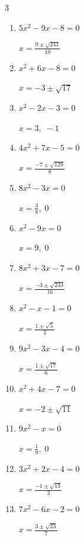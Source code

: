 \begin{multicols}{3}
\begin{enumerate}
  \item $5x^{2}-9x-8=0$

        $\displaystyle x=\frac{9\pm \sqrt{241}}{10}$

  \item $x^{2}+6x-8=0$

        $\displaystyle x=-3\pm \sqrt{17}$

\columnbreak %

  \item $x^{2}-2x-3=0$

        $\displaystyle x=3, \; -1$

  \item $4x^{2}+7x-5=0$

        $\displaystyle x=\frac{-7\pm \sqrt{129}}{8}$

  \item $8x^{2}-3x=0$

        $\displaystyle x=\frac{3}{8}, \; 0$

  \item $x^{2}-9x=0$

        $\displaystyle x=9, \; 0$

  \item $8x^{2}+3x-7=0$

        $\displaystyle x=\frac{-3\pm \sqrt{233}}{16}$

  \item $x^{2}-x-1=0$

        $\displaystyle x=\frac{1\pm \sqrt{5}}{2}$

  \item $9x^{2}-3x-4=0$

        $\displaystyle x=\frac{1\pm \sqrt{17}}{6}$

\columnbreak %

  \item $x^{2}+4x-7=0$

        $\displaystyle x=-2\pm \sqrt{11}$

  \item $9x^{2}-x=0$

        $\displaystyle x=\frac{1}{9}, \; 0$

  \item $3x^{2}+2x-4=0$

        $\displaystyle x=\frac{-1\pm \sqrt{13}}{3}$

  \item $7x^{2}-6x-2=0$

        $\displaystyle x=\frac{3\pm \sqrt{23}}{7}$


\end{enumerate}
\end{multicols}
